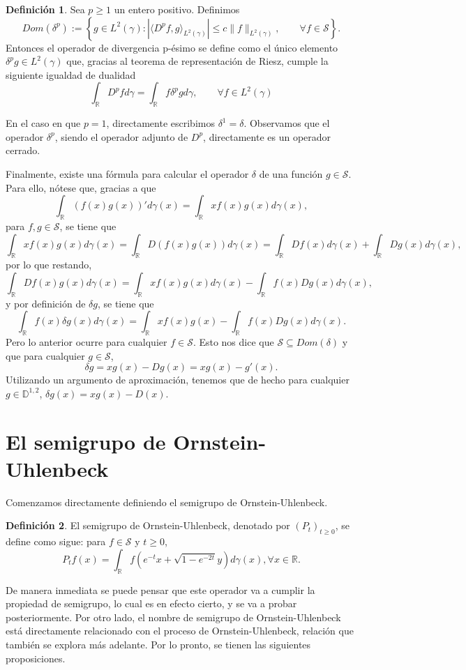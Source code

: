 \documentclass[letterpaper,twoside,12pt]{book}
\newcommand{\R}{\mathbb{R}}
\newcommand{\1}{\mathds{1}}
\newcommand{\abs}[1]{\left\lvert #1 \right\rvert}
\theoremstyle{definition}
\newtheorem{dfn}{Definición}
\theoremstyle{definition}
\theoremstyle{definition}
\theoremstyle{definition}
\theoremstyle{definition}
\theoremstyle{definition}
\theoremstyle{definition}
\begin{document}
 \begin{dfn}
    Sea $p\geq1$ un entero positivo. Definimos $$Dom(\delta^p):=\left\{g\in L^2(\gamma): \abs{\langle D^{p}f,g\rangle_{L^2(\gamma)}}\leq c\|f\|_{L^2(\gamma)}, \qquad \forall f\in \mathcal{S}\right\}.$$ 
    Entonces el operador de divergencia p-ésimo se define como el único elemento $\delta^{p} g\in L^2(\gamma)$ que, gracias al teorema de representación de Riesz, cumple la siguiente igualdad de dualidad
    \[
        \int_\R D^{p}fd\gamma=\int_\R f\delta^{p}gd\gamma, \qquad \forall f\in L^2(\gamma)  
       \]
 \end{dfn}
 En el caso en que $p=1$, directamente escribimos $\delta^1=\delta$. Observamos que el operador $\delta^p$, siendo el operador adjunto de $D^{p}$, directamente es un operador cerrado.

Finalmente, existe una fórmula para calcular el operador $\delta$ de una función $g\in \mathcal{S}$. Para ello, nótese que, gracias a que 
\[
\int_\R (f(x)g(x))'d\gamma(x)=\int_\R xf(x)g(x)d\gamma(x), 
\]
para $f,g\in \mathcal{S}$, se tiene que 
\[
    \int_\R xf(x)g(x)d\gamma(x)=\int_\R D \left(f(x)g(x)\right) d\gamma(x)=\int_\R Df(x)d\gamma(x) +\int_\R Dg(x)d\gamma(x),
\]
por lo que restando, 
\[
    \int_\R Df(x)g(x)d\gamma(x)=\int_\R xf(x)g(x)d\gamma(x)-\int_\R f(x)Dg(x)d\gamma(x),
\]
y por definición de $\delta g$, se tiene que 
\[
\int_\R f(x)\delta g(x)d\gamma(x)=\int_\R xf(x)g(x)-\int_\R f(x)Dg(x)d\gamma(x).   
\]
Pero lo anterior ocurre para cualquier $f\in \mathcal{S}$. Esto nos dice que $\mathcal{S}\subseteq Dom(\delta)$ y que para cualquier $g\in \mathcal{S}$, 
\[
\delta g=xg(x)-Dg(x)=xg(x)-g'(x).    
\]
Utilizando un argumento de aproximación, tenemos que de hecho para cualquier $g\in \mathbb{D}^{1,2}$, $\delta g(x)=xg(x)-D(x)$.

\section{El semigrupo de Ornstein-Uhlenbeck}
Comenzamos directamente definiendo el semigrupo de Ornstein-Uhlenbeck. 
\begin{dfn}
    El semigrupo de Ornstein-Uhlenbeck, denotado por $(P_t)_{t\geq0}$, se define como sigue: para $f\in \mathcal{S}$ y $t\geq0$,
    \[
    P_tf(x)=\int_\R f\left(e^{-t}x+\sqrt{1-e^{-2t}}y\right)d\gamma(x), \forall x\in \R.
    \]
\end{dfn}
De manera inmediata se puede pensar que este operador va a cumplir la propiedad de semigrupo, lo cual es en efecto cierto, y se va a probar posteriormente. Por otro lado, el nombre de semigrupo de Ornstein-Uhlenbeck está directamente relacionado con el proceso de Ornstein-Uhlenbeck, relación que también se explora más adelante. Por lo pronto, se tienen las siguientes proposiciones.
\end{document}
